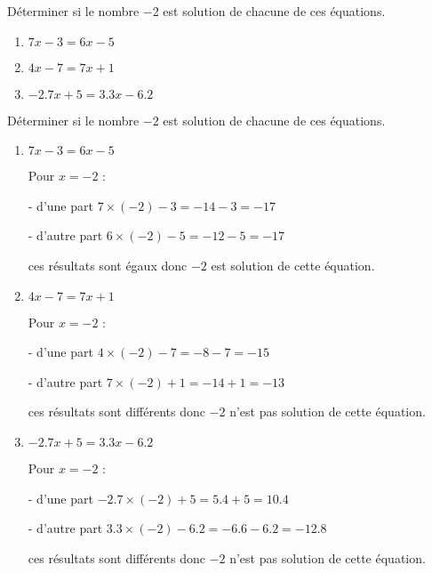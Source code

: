 \begin{exercice*}
    Déterminer si le nombre \num{-2} est solution de chacune de ces équations.
    \begin{enumerate}
        \item $7x-3=6x-5$
        \item $4x-7=7x+1$
        \item $\num{-2.7}x+5=\num{3.3}x-\num{6.2}$
    \end{enumerate}
\end{exercice*}
\begin{corrige}
    Déterminer si le nombre \num{-2} est solution de chacune de ces équations.
    \begin{enumerate}
        \item $7x-3=6x-5$
        
        {\color{red}Pour $x=-2$ :
        
        - d'une part $7\times (-2) -3 = -14 - 3 = -17$
        
        - d'autre part $6\times (-2) - 5 = -12 - 5 = -17$
        
        ces résultats sont égaux donc $-2$ est solution de cette équation.
        }
        \item $4x-7=7x+1$
        
        {\color{red}Pour $x=-2$ :
        
        - d'une part $4\times (-2) -7 = -8 - 7 = -15$
        
        - d'autre part $7\times (-2) +1 = -14 +1 = -13$
        
        ces résultats sont différents donc $-2$ n'est pas solution de cette équation.
        }
        \item $\num{-2.7}x+5=\num{3.3}x-\num{6.2}$
        
        {\color{red}Pour $x=-2$ :
        
        - d'une part $\num{-2.7}\times (-2) +5 = \num{5.4}+5 = \num{10.4}$
        
        - d'autre part $\num{3.3}\times (-2) - \num{6.2} = \num{-6.6} - \num{6.2} = \num{-12.8}$
        
        ces résultats sont différents donc $-2$ n'est pas solution de cette équation.
        }
    \end{enumerate}
\end{corrige}

